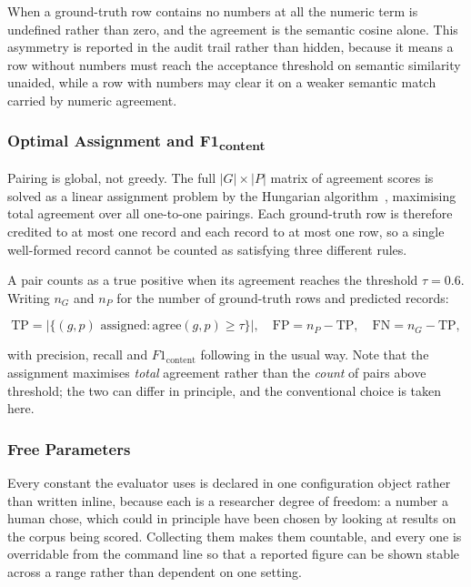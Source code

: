 \documentclass[11pt]{article}
\begin{document}
When a ground-truth row contains no numbers at all
the numeric term is undefined rather than zero, and the agreement is the semantic
cosine alone. This asymmetry is reported in the audit trail rather than hidden,
because it means a row without numbers must reach the acceptance threshold on
semantic similarity unaided, while a row with numbers may clear it on a weaker
semantic match carried by numeric agreement.

\subsubsection{Optimal Assignment and F1\textsubscript{content}}
Pairing is global, not greedy. The full $|G| \times |P|$ matrix of agreement
scores is solved as a linear assignment problem by the Hungarian
algorithm~\cite{kuhn1955hungarian}, maximising total agreement over all one-to-one
pairings. Each ground-truth row is therefore credited to at most one record and
each record to at most one row, so a single well-formed record cannot be counted
as satisfying three different rules.

A pair counts as a true positive when its agreement reaches the threshold
$\tau = 0.6$. Writing $n_G$ and $n_P$ for the number of ground-truth rows and
predicted records:

\begin{equation}
\label{eq:prf}
\mathrm{TP} = \big|\{(g,p) \text{ assigned} : \mathrm{agree}(g,p) \ge \tau\}\big|,
\quad
\mathrm{FP} = n_P - \mathrm{TP},
\quad
\mathrm{FN} = n_G - \mathrm{TP},
\end{equation}

with precision, recall and $F1_{\text{content}}$ following in the usual way. Note
that the assignment maximises \emph{total} agreement rather than the \emph{count}
of pairs above threshold; the two can differ in principle, and the conventional
choice is taken here.

\subsubsection{Free Parameters}
\label{sec:free_params}
Every constant the evaluator uses is declared in one configuration object rather
than written inline, because each is a researcher degree of freedom: a number
a human chose, which could in principle have been chosen by looking at results on
the corpus being scored. Collecting them makes them countable, and every one is
overridable from the command line so that a reported figure can be shown stable
across a range rather than dependent on one setting.
\end{document}
